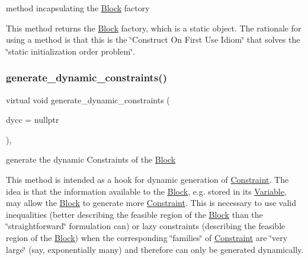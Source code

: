 method incapsulating the \mbox{\hyperlink{class_s_m_spp__di__unipi__it_1_1_block}{Block}} factory 

This method returns the \mbox{\hyperlink{class_s_m_spp__di__unipi__it_1_1_block}{Block}} factory, which is a static object. The rationale for using a method is that this is the \char`\"{}\+Construct On First Use
\+Idiom\char`\"{} that solves the \char`\"{}static initialization order problem\char`\"{}. \mbox{\label{class_s_m_spp__di__unipi__it_1_1_block_a306892932ce912f30548f3f3e4072e9b}} 
\subsubsection{\texorpdfstring{generate\+\_\+dynamic\+\_\+constraints()}{generate\_dynamic\_constraints()}}
{\footnotesize\ttfamily virtual void generate\+\_\+dynamic\+\_\+constraints (\begin{DoxyParamCaption}\item[{\mbox{\hyperlink{class_s_m_spp__di__unipi__it_1_1_configuration}{Configuration}} $\ast$}]{dycc = {\ttfamily nullptr} }\end{DoxyParamCaption})\hspace{0.3cm}{\ttfamily [inline]}, {\ttfamily [virtual]}}



generate the dynamic Constraints of the \mbox{\hyperlink{class_s_m_spp__di__unipi__it_1_1_block}{Block}} 

This method is intended as a hook for dynamic generation of \mbox{\hyperlink{class_s_m_spp__di__unipi__it_1_1_constraint}{Constraint}}. The idea is that the information available to the \mbox{\hyperlink{class_s_m_spp__di__unipi__it_1_1_block}{Block}}, e.\+g. stored in its \mbox{\hyperlink{class_s_m_spp__di__unipi__it_1_1_variable}{Variable}}, may allow the \mbox{\hyperlink{class_s_m_spp__di__unipi__it_1_1_block}{Block}} to generate more \mbox{\hyperlink{class_s_m_spp__di__unipi__it_1_1_constraint}{Constraint}}. This is necessary to use valid inequalities (better describing the feasible region of the \mbox{\hyperlink{class_s_m_spp__di__unipi__it_1_1_block}{Block}} than the \char`\"{}straightforward\char`\"{} formulation can) or lazy constraints (describing the feasible region of the \mbox{\hyperlink{class_s_m_spp__di__unipi__it_1_1_block}{Block}}) when the corresponding \char`\"{}families\char`\"{} of \mbox{\hyperlink{class_s_m_spp__di__unipi__it_1_1_constraint}{Constraint}} are \char`\"{}very large\char`\"{} (say, exponentially many) and therefore can only be generated dynamically.

